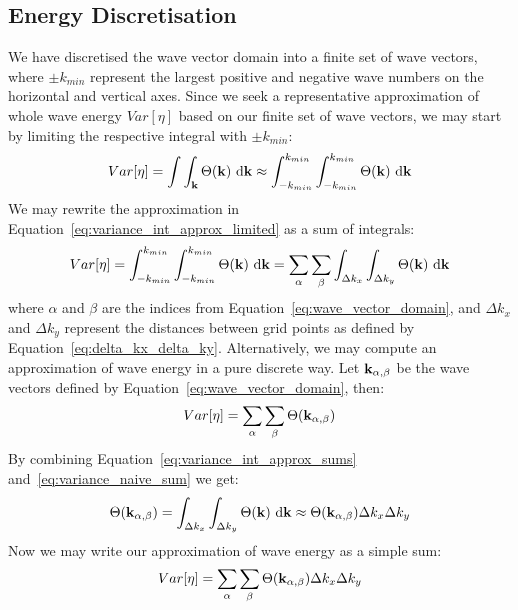 \subsection{Energy Discretisation}
We have discretised the wave vector domain into a finite set of wave vectors, 
where $\pm k_{min}$ represent the largest positive and negative wave numbers on 
the horizontal and vertical axes. Since we seek a representative approximation 
of whole wave energy $Var[\eta]$ based on our finite set of wave vectors, we may 
start by limiting the respective integral with $\pm k_{min}$:
\begin{equation}
\label{eq:variance_int_approx_limited}
Var[\eta] = \int\int_{\mathbf{k}}\Theta(\mathbf{k})~\mathrm{d}\mathbf{k}
\approx\int_{-k_{min}}^{k_{min}}\int_{-k_{min}}^{k_{min}}\Theta(\mathbf{k}
)~\mathrm{d}\mathbf{k}
\end{equation}
We may rewrite the approximation in 
Equation~\ref{eq:variance_int_approx_limited} as a sum of integrals:
%
\begin{equation}
\label{eq:variance_int_approx_sums}
 Var[\eta] = \int_{-k_{min}}^{k_{min}}\int_{-k_{min}}^{k_{min}}\Theta(\mathbf{k}
)~\mathrm{d}\mathbf{k} = \sum_{\alpha}\sum_{\beta}\int_{\Delta k_x}\int_{\Delta 
k_y}\Theta(\mathbf{k})~\mathrm{d}\mathbf{k}
\end{equation}
%
where $\alpha$ and $\beta$ are the indices from 
Equation~\ref{eq:wave_vector_domain}, and $\Delta k_x$ and $\Delta k_y$ 
represent the distances between grid points as defined by 
Equation~\ref{eq:delta_kx_delta_ky}. Alternatively, we may compute an 
approximation of wave energy in a pure discrete way. Let 
$\mathbf{k}_{\alpha,\beta}$ be the wave vectors defined by 
Equation~\ref{eq:wave_vector_domain}, then:
%
\begin{equation}
\label{eq:variance_naive_sum}
 Var[\eta] = \sum_{\alpha}\sum_{\beta}\Theta(\mathbf{k}_{\alpha,\beta})
\end{equation}
%
By combining Equation~\ref{eq:variance_int_approx_sums} 
and~\ref{eq:variance_naive_sum} we get:
%
\begin{equation}
 \Theta(\mathbf{k}_{\alpha,\beta}) = \int_{\Delta k_x}\int_{\Delta 
k_y}\Theta(\mathbf{k})~\mathrm{d}\mathbf{k} \approx 
\Theta(\mathbf{k}_{\alpha,\beta})\Delta k_x\Delta k_y
\end{equation}
Now we may write our approximation of wave energy as a simple sum:
\begin{equation}
\label{eq:variance_discrete}
 Var[\eta] = \sum_{\alpha}\sum_{\beta}\Theta(\mathbf{k}_{\alpha,\beta})\Delta k_x 
\Delta k_y
\end{equation}
%
